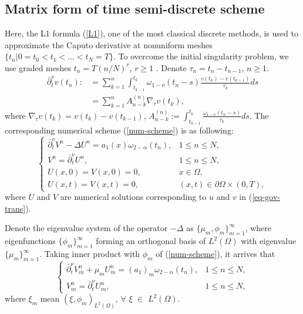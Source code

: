 \documentclass[11pt]{article}
\numberwithin{equation}{section}
\begin{document}
\subsection{Matrix form of time semi-discrete scheme}
Here, the L1 formula (\ref{L1}), one of the most classical discrete methods, is used to approximate the Caputo derivative at nonuniform meshes $\{t_n|0=t_0<t_1<\dots <t_N=T\}$. To overcome the initial singularity problem, we use graded meshes $t_n=T(n/N)^r$, $r\ge1$ \cite{LiZhang2025}. Denote $\tau_n=t_n-t_{n-1}$, $n\geq1$.
\begin{align}\nonumber
\bar\partial_t^\nu v(t_n)
:&= \sum_{k=1}^{n}\int_{t_{k-1}}^{t_k}\omega_{1-\nu}(t_n-s)\frac{v(t_k)-v(t_{k-1})}{\tau_k}ds\\ \label{L1}
&=\sum_{k=1}^nA_{n-k}^{(n)}\nabla_\tau v(t_k),
\end{align}
where $\nabla_\tau v(t_k)=v(t_k)-v(t_{k-1})$, $A_{n-k}^{(n)}:=\int_{t_{k-1}}^{t_k}\frac{\omega_{1-\nu}(t_n-s)}{\tau_k}ds$. The corresponding numerical scheme (\ref{num-scheme})  is as following:
\begin{equation}\label{num-scheme}
\begin{cases}
  \bar\partial_t^\nu V^n - \Delta U^n = a_1(x)\omega_{2-\alpha}(t_n), & 1\le n \le N, \\
  V^n  = \bar\partial_t^\nu U^n, & 1\le n \le N, \\
  U(x,0) = V(x,0)=0, & x \in \Omega, \\
  U(x,t) = V(x,t)=0, & (x,t) \in \partial \Omega \times (0,T),
\end{cases}
\end{equation}
where $U$ and $V$ are numerical solutions corresponding to $u$ and $v$ in (\ref{eq-gov-trans}). 

Denote the eigenvalue system of the operator $-\Delta$ as $\{\mu_m,\phi_m\}_{m=1}^{\infty}$, where eigenfunctions $\{\phi_m\}_{m=1}^\infty$ forming an orthogonal basis of $L^2(\Omega)$ with eigenvalue $\{\mu_m\}_{m=1}^\infty$. Taking inner product with $\phi_m$ of (\ref{num-scheme}), it arrives that
\begin{equation}\label{num-scheme-c}
\begin{cases}
  \bar\partial_t^\nu V_m^n + \mu_m U_m^n = (a_1)_m\omega_{2-\alpha}(t_n), & 1\le n \le N, \\
  V_m^n  = \bar\partial_t^\nu U_m^n, & 1\le n \le N, 
\end{cases}
\end{equation}
where $\xi_m$ mean $(\xi,\phi_m)_{L^2(\Omega)}$, $\forall$ $\xi$ $\in$ $L^2(\Omega)$.
\end{document}
